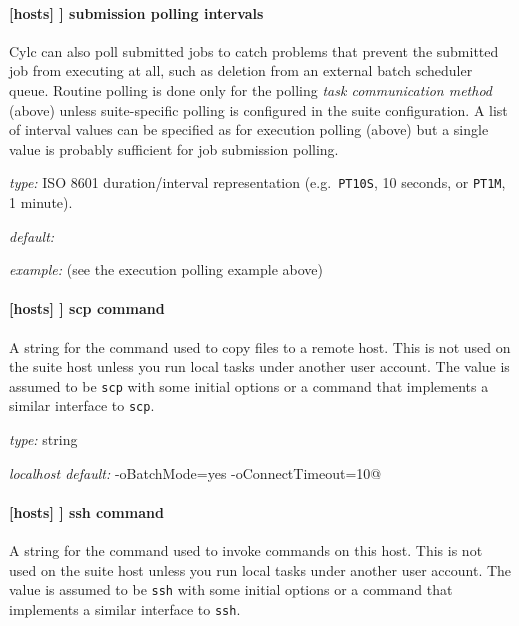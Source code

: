 \paragraph[submission polling intervals]{[hosts] \textrightarrow [[HOST]] \textrightarrow submission polling intervals}
\label{submission_polling}

Cylc can also poll submitted jobs to catch problems that prevent the
submitted job from executing at all, such as deletion from an external
batch scheduler queue. Routine polling is done only for the polling {\em
task communication method} (above) unless suite-specific polling
is configured in the suite configuration. A list of interval
values can be specified as for execution polling (above) but a single
value is probably sufficient for job submission polling.

\begin{myitemize}
\item {\em type:} ISO 8601 duration/interval representation (e.g.\ 
\lstinline=PT10S=, 10 seconds, or \lstinline=PT1M=, 1 minute).
\item {\em default:}
\item {\em example:} (see the execution polling example above)
\end{myitemize}

\paragraph[scp command]{[hosts] \textrightarrow [[HOST]] \textrightarrow scp command }

A string for the command used to copy files to a remote host. This is not used
on the suite host unless you run local tasks under another user account. The
value is assumed to be \lstinline=scp= with some initial options or a command
that implements a similar interface to \lstinline=scp=.


\begin{myitemize}
\item {\em type:} string
\item {\em localhost default:} \lstinline@scp -oBatchMode=yes -oConnectTimeout=10@
\end{myitemize}

\paragraph[ssh command]{[hosts] \textrightarrow [[HOST]] \textrightarrow ssh command }

A string for the command used to invoke commands on this host. This is not
used on the suite host unless you run local tasks under another user account.
The value is assumed to be \lstinline=ssh= with some initial options or a
command that implements a similar interface to \lstinline=ssh=.

